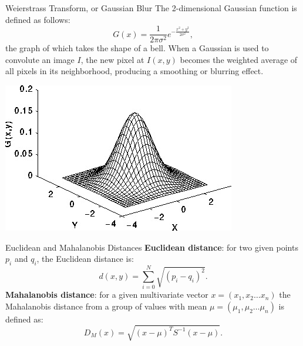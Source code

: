\documentclass[xcolor=dvipsnames]{beamer}
\begin{document}
\begin{frame}[label=math-weierstrass]{Weierstrass Transform, or Gaussian Blur}
 The 2-dimensional Gaussian function is defined as follows:
 \begin{equation}
  G(x) = \frac{1}{2 \pi \sigma^2} e^{-\frac{x^2+y^2}{2\sigma^2}},
 \end{equation}
 the graph of which takes the shape of a bell. When a Gaussian is used to convolute an image $I$, the new pixel at $I(x,y)$ becomes the weighted average of all pixels in its neighborhood, producing a smoothing or blurring effect.
\end{frame}

\begin{frame}
\begin{center}
\includegraphics[width=\textwidth]{imgs/gauss.jpg}
\end{center}
\end{frame}

\begin{frame}[label=math-distance]{Euclidean and Mahalanobis Distances}
 \textbf{Euclidean distance}: for two given points $p_i$ and $q_i$, the Euclidean distance is:
  \begin{equation} \label{eq:euclidean}
   d(x,y) = \sum_{i=0}^{N} \sqrt{(p_i-q_i)^2}.
  \end{equation}
 \textbf{Mahalanobis distance}: for a given multivariate vector $x = (x_1, x_2 \ldots x_n)$ the Mahalanobis distance from a group of values with mean $\mu = (\mu_1, \mu_2 \ldots \mu_n)$ is defined as:
  \begin{equation} \label{eq:mahalanobis}
   D_M(x) = \sqrt{(x-\mu)^TS^{-1}(x-\mu)}.
  \end{equation}
\end{frame}
\end{document}
